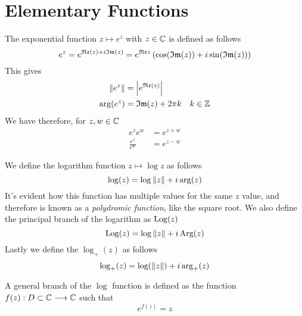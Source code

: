 \documentclass[../complete.tex]{subfiles}
\begin{document}
\section{Elementary Functions}
\begin{dfn}[Exponential]
	The exponential function $z\mapsto e^z$ with $z\in\mathbb{C}$ is defined as follows
	\begin{equation}
		e^z=e^{\mathfrak{Re}(z)+i\mathfrak{Im}(z)}=e^{\mathfrak{Re}{z}}\left( \cos(\mathfrak{Im}(z))+i\sin(\mathfrak{Im}(z)) \right)
		\label{eq:exponential}
	\end{equation}
	This gives
	\begin{equation}
		\begin{aligned}
			\norm{e^z}&=\abs{e^{\mathfrak{Re}(z)}}\\
			\arg(e^z)&=\mathfrak{Im}(z)+2\pi k\quad k\in\mathbb{Z}
		\end{aligned}
		\label{eq:normexpz}
	\end{equation}
	We have therefore, for $z,w\in\mathbb{C}$
	\begin{equation}
		\begin{aligned}
			e^{z}e^w&=e^{z+w}\\
			\frac{e^z}{e^w}&=e^{z-w}
		\end{aligned}
		\label{eq:propexp}
	\end{equation}
\end{dfn}
\begin{dfn}[Logarithm]
	We define the logarithm function $z\mapsto\log{z}$ as follows
	\begin{equation}
		\log(z)=\log\norm{z}+i\arg(z)
		\label{eq:complexlog}
	\end{equation}
	It's evident how this function has multiple values for the same $z$ value, and therefore is known as a \textit{polydromic function}, like the square root.
	We also define the principal branch of the logarithm as $\operatorname{\mathrm{Log}}(z)$
	\begin{equation}
		\operatorname{\mathrm{Log}}(z)=\log\norm{z}+i\operatorname{\mathrm{Arg}}(z)
		\label{eq:princlog}
	\end{equation}
    Lastly we define the $\log_+(z)$ as follows
\begin{equation}
    \log_+(z)=\log(\norm{z})+i\arg_+(z)
\end{equation}
\end{dfn}
\begin{dfn}
	A general branch of the $\log$ function is defined as the function $f(z):D\subset\mathbb{C}\overset{}{\longrightarrow}\mathbb{C}$ such that
	\begin{equation}
		e^{f(z)}=z
		\label{eq:logbranchfunc}
	\end{equation}
\end{dfn}
\end{document}
